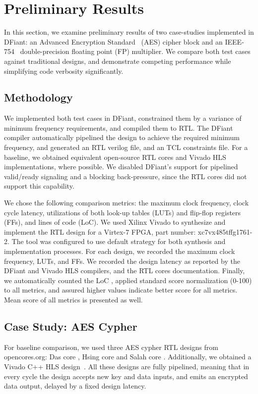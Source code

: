\section{Preliminary Results}
\label{sec:results}
In this section, we examine preliminary results of two case-studies implemented in DFiant: an Advanced Encryption Standard~\cite{pub2001197} (AES) cipher block and an IEEE-754~\cite{IEEE2008} double-precision floating point (FP) multiplier. We compare both test cases against traditional designs, and demonstrate competing performance while simplifying code verbosity significantly. 

\subsection{Methodology}
We implemented both test cases in DFiant, constrained them by a variance of minimum frequency requirements, and compiled them to RTL. The DFiant compiler automatically pipelined the design to achieve the required minimum frequency, and generated an RTL verilog file, and an TCL constraints file. For a baseline, we obtained equivalent open-source RTL cores and Vivado HLS implementations, where possible. We disabled DFiant's support for pipelined valid/ready signaling and a blocking back-pressure, since the RTL cores did not support this capability.

We chose the following comparison metrics: the maximum clock frequency, clock cycle latency, utilizations of both look-up tables (LUTs) and flip-flop registers (FFs), and lines of code (LoC). We used Xilinx Vivado to synthesize and implement the RTL design for a Virtex-7 FPGA, part number: xc7vx485tffg1761-2. The tool was configured to use default strategy for both synthesis and implementation processes. For each design, we recorded the maximum clock frequency, LUTs, and FFs. We recorded the design latency as reported by the DFiant and Vivado HLS compilers, and the RTL cores documentation. Finally, we automatically counted the LoC \cite{danial2009cloc}, applied standard score normalization (0-100) to all metrics, and assured higher values indicate better score for all metrics. Mean score of all metrics is presented as well.

\subsection{Case Study: AES Cypher}
For baseline comparison, we used three AES cypher RTL designs from opencores.org: Das core \cite{das2010fully}, Hsing core \cite{hsing2013aes} and Salah core \cite{salah2013aespipe}. Additionally, we obtained a Vivado C++ HLS design~\cite{oflynn2014rapid}. All these designs are fully pipelined, meaning that in every cycle the design accepts new key and data inputs, and emits an encrypted data output, delayed by a fixed design latency.

